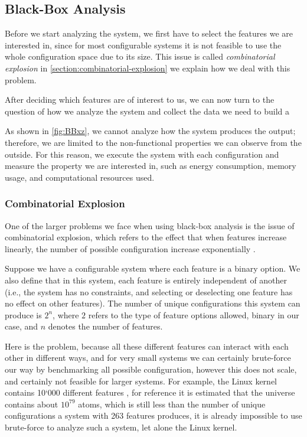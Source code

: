 \subsection{Black-Box Analysis}\label{ch:Black-Box-Analysis}

Before we start analyzing the system, we first have to select the features we are interested in, since for most configurable systems it is 
not feasible to use the whole configuration space due to its size. This issue is called \emph{combinatorial explosion} in \autoref{section:combinatorial-explosion}
we explain how we deal with this problem.

After deciding which features are of interest to us, we can now turn to the question 
of how we analyze the system and collect the data we need to build a \perfInfluenceModel

As shown in \autoref{fig:BBxz}, we cannot analyze how the system produces the output; 
therefore, we are limited to the non-functional properties we can observe from the outside. For this reason, 
we execute the system with each configuration and measure the property we are interested in, such as energy consumption, memory usage, 
and computational resources used.  

\subsubsection{Combinatorial Explosion}\label{section:combinatorial-explosion}
One of the larger problems we face when using black-box analysis is the issue of combinatorial explosion, 
which refers to the effect that when features increase linearly, the number of possible configuration
increase exponentially \cite{Combinatorial-explosion}.

Suppose we have a configurable system where each feature is a binary option.
We also define that in this system, each feature is entirely independent of another
(i.e., the system has no constraints, and selecting or deselecting one feature has no effect on other features).
The number of unique configurations this system can produce is $2^n$, where $2$ refers to the type of feature options allowed,
binary in our case, and $n$ denotes the number of features. 

Here is the problem, because all these different features can interact with each other in different ways, and for very small systems
we can certainly brute-force our way by benchmarking all possible configuration, however this does not scale, and certainly not feasible for 
larger systems. For example, the Linux kernel contains 10`000 different features \cite{Linux-Kernel}, for reference it is estimated that the universe
contains about $10^{79}$ atoms, which is still less than the number of unique configurations a system with 263 features produces, it is already impossible to use brute-force to analyze
such a system, let alone the Linux kernel.

